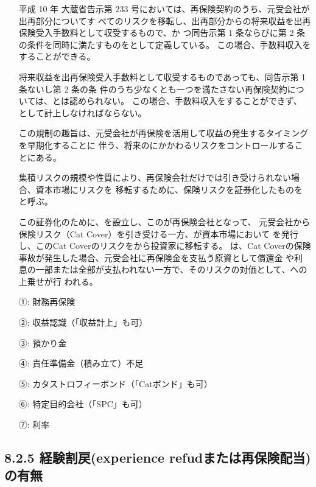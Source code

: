 \documentclass[report,gutter=10mm,fore-edge=10mm,uplatex,dvipdfmx]{jlreq}
\begin{document}
\begin{itemize}
\item[] 平成 10 年 大蔵省告示第 233 号においては、再保険契約のうち、元受会社が出再部分についてす
 べてのリスクを移転し、出再部分からの将来収益を出再保険受入手数料として収受するもので、か
 つ同告示第 1 条ならびに第 2 条の条件を同時に満たすものをとして定義している。
 この場合、手数料収入をすることができる。

\item[] 将来収益を出再保険受入手数料として収受するものであっても、同告示第 1 条ないし第 2 条の条
 件のうち少なくとも一つを満たさない再保険契約については、とは認められない。
 この場合、手数料収入をすることができず、
 として計上しなければならない。

\item[] この規制の趣旨は、元受会社が再保険を活用して収益の発生するタイミングを早期化することに
 伴う、将来のにかかわるリスクをコントロールすることにある。

\item[] 集積リスクの規模や性質により、再保険会社だけでは引き受けられない場合、資本市場にリスクを
 移転するために、保険リスクを証券化したものをと呼ぶ。

\item[] この証券化のために、を設立し、このが再保険会社となって、
 元受会社から保険リスク（Cat Cover）を引き受ける一方、が資本市場において
 を発行し、このCat Coverのリスクをから投資家に移転する。
 は、Cat Coverの保険事故が発生した場合、元受会社に再保険金を支払う原資として償還金
 や利息の一部または全部が支払われない一方で、そのリスクの対価として、への上乗せが行
 われる。
\end{itemize}

\answer{}
\begin{itemize}
\item[ ①: ] 財務再保険
\item[ ②: ] 収益認識（「収益計上」も可）
\item[ ③: ] 預かり金
\item[ ④: ] 責任準備金（積み立て）不足
\item[ ⑤: ] カタストロフィーボンド（「Catボンド」も可）
\item[ ⑥: ] 特定目的会社（「SPC」も可）
\item[ ⑦: ] 利率
\end{itemize}
\subsection{8.2.5 経験割戻(experience refudまたは再保険配当)の有無}
\end{document}
